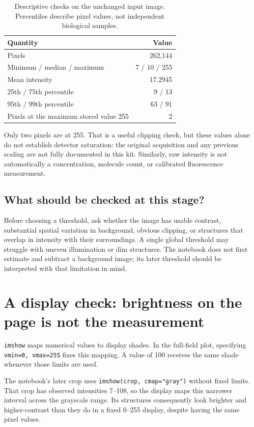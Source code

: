\documentclass[11pt,letterpaper]{article}
\newcommand{\field}[1]{\nolinkurl{#1}}
\begin{document}
\begin{table}[htbp]
\centering
\caption{Descriptive checks on the unchanged input image. Percentiles describe pixel values, not independent biological samples.}
\begin{tabular}{lr}
\toprule
\textbf{Quantity} & \textbf{Value} \\
\midrule
Pixels & 262,144 \\
Minimum / median / maximum & 7 / 10 / 255 \\
Mean intensity & 17.2945 \\
25th / 75th percentile & 9 / 13 \\
95th / 99th percentile & 63 / 91 \\
Pixels at the maximum stored value 255 & 2 \\
\bottomrule
\end{tabular}
\end{table}

Only two pixels are at 255. That is a useful clipping check, but these values alone do not establish detector saturation: the original acquisition and any previous scaling are not fully documented in this kit. Similarly, raw intensity is not automatically a concentration, molecule count, or calibrated fluorescence measurement.

\subsection{What should be checked at this stage?}
Before choosing a threshold, ask whether the image has usable contrast, substantial spatial variation in background, obvious clipping, or structures that overlap in intensity with their surroundings. A single global threshold may struggle with uneven illumination or dim structures. The notebook does not first estimate and subtract a background image; its later threshold should be interpreted with that limitation in mind.

\section{A display check: brightness on the page is not the measurement}
\label{sec:display}

\field{imshow} maps numerical values to display shades. In the full-field plot, specifying \field{vmin=0, vmax=255} fixes this mapping. A value of 100 receives the same shade whenever those limits are used.

The notebook's later crop uses \field{imshow(crop, cmap="gray")} without fixed limits. That crop has observed intensities 7--108, so the display maps this narrower interval across the grayscale range. Its structures consequently look brighter and higher-contrast than they do in a fixed 0--255 display, despite having the same pixel values.
\end{document}
